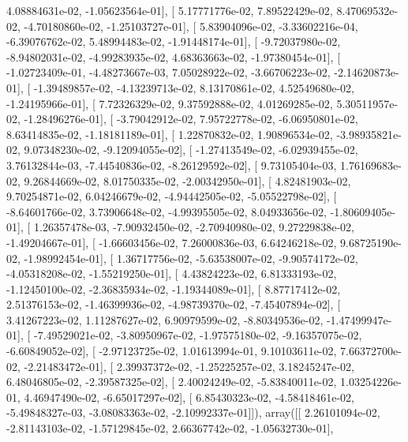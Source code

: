 \documentclass{article}
\begin{document}
          4.08884631e-02,  -1.05623564e-01],
       [  5.17771776e-02,   7.89522429e-02,   8.47069532e-02,
         -4.70180860e-02,  -1.25103727e-01],
       [  5.83904096e-02,  -3.33602216e-04,  -6.39076762e-02,
          5.48994483e-02,  -1.91448174e-01],
       [ -9.72037980e-02,  -8.94802031e-02,  -4.99283935e-02,
          4.68363663e-02,  -1.97380454e-01],
       [ -1.02723409e-01,  -4.48273667e-03,   7.05028922e-02,
         -3.66706223e-02,  -2.14620873e-01],
       [ -1.39489857e-02,  -4.13239713e-02,   8.13170861e-02,
          4.52549680e-02,  -1.24195966e-01],
       [  7.72326329e-02,   9.37592888e-02,   4.01269285e-02,
          5.30511957e-02,  -1.28496276e-01],
       [ -3.79042912e-02,   7.95722778e-02,  -6.06950801e-02,
          8.63414835e-02,  -1.18181189e-01],
       [  1.22870832e-02,   1.90896534e-02,  -3.98935821e-02,
          9.07348230e-02,  -9.12094055e-02],
       [ -1.27413549e-02,  -6.02939455e-02,   3.76132844e-03,
         -7.44540836e-02,  -8.26129592e-02],
       [  9.73105404e-03,   1.76169683e-02,   9.26844669e-02,
          8.01750335e-02,  -2.00342950e-01],
       [  4.82481903e-02,   9.70254871e-02,   6.04246679e-02,
         -4.94442505e-02,  -5.05522798e-02],
       [ -8.64601766e-02,   3.73906648e-02,  -4.99395505e-02,
          8.04933656e-02,  -1.80609405e-01],
       [  1.26357478e-03,  -7.90932450e-02,  -2.70940980e-02,
          9.27229838e-02,  -1.49204667e-01],
       [ -1.66603456e-02,   7.26000836e-03,   6.64246218e-02,
          9.68725190e-02,  -1.98992454e-01],
       [  1.36717756e-02,  -5.63538007e-02,  -9.90574172e-02,
         -4.05318208e-02,  -1.55219250e-01],
       [  4.43824223e-02,   6.81333193e-02,  -1.12450100e-02,
         -2.36835934e-02,  -1.19344089e-01],
       [  8.87717412e-02,   2.51376153e-02,  -1.46399936e-02,
         -4.98739370e-02,  -7.45407894e-02],
       [  3.41267223e-02,   1.11287627e-02,   6.90979599e-02,
         -8.80349536e-02,  -1.47499947e-01],
       [ -7.49529021e-02,  -3.80950967e-02,  -1.97575180e-02,
         -9.16357075e-02,  -6.60849052e-02],
       [ -2.97123725e-02,   1.01613994e-01,   9.10103611e-02,
          7.66372700e-02,  -2.21483472e-01],
       [  2.39937372e-02,  -1.25225257e-02,   3.18245247e-02,
          6.48046805e-02,  -2.39587325e-02],
       [  2.40024249e-02,  -5.83840011e-02,   1.03254226e-01,
          4.46947490e-02,  -6.65017297e-02],
       [  6.85430323e-02,  -4.58418461e-02,  -5.49848327e-03,
         -3.08083363e-02,  -2.10992337e-01]]), array([[  2.26101094e-02,  -2.81143103e-02,  -1.57129845e-02,
          2.66367742e-02,  -1.05632730e-01],
\end{document}
